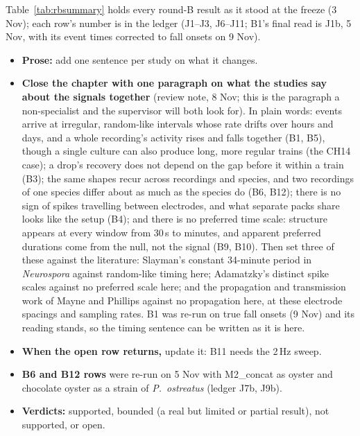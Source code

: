 \begin{instructions}
Table~\ref{tab:rbsummary} holds every round-B result as it stood at the freeze (3 Nov); each row's number is in the
ledger (J1--J3, J6--J11; B1's final read is J1b, 5 Nov, with its event times corrected to fall onsets on 9 Nov).
\begin{itemize}
  \item \textbf{Prose:} add one sentence per study on what it changes.
  \item \textbf{Close the chapter with one paragraph on what the studies say about the signals together} (review note,
        8 Nov; this is the paragraph a non-specialist and the supervisor will both look for). In plain words: events
        arrive at irregular, random-like intervals whose rate drifts over hours and days, and a whole recording's activity
        rises and falls together (B1, B5), though a single culture can also produce long, more regular trains (the CH14
        case); a drop's recovery does not depend on the gap before it within a train (B3); the same shapes recur
        across recordings and species, and two recordings of one species differ about as much as the species do (B6,
        B12); there is no sign of spikes travelling between electrodes, and what separate packs share looks like the
        setup (B4); and there is no preferred time scale: structure appears at every window from 30\,s to minutes, and
        apparent preferred durations come from the null, not the signal (B9, B10). Then set three of these against the
        literature: Slayman's constant 34-minute period in \emph{Neurospora} \cite{slayman} against random-like timing
        here; Adamatzky's distinct spike scales \cite{adamatzky2023} against no preferred scale here; and the
        propagation and transmission work of Mayne and Phillips \cite{mayne,phillips} against no propagation here, at
        these electrode spacings and sampling rates. B1 was re-run on true fall onsets (9 Nov) and its reading stands,
        so the timing sentence can be written as it is here.
  \item \textbf{When the open row returns,} update it: B11 needs the 2\,Hz sweep.
  \item \textbf{B6 and B12 rows} were re-run on 5 Nov with M2\_concat as oyster and chocolate oyster as a strain of \emph{P.\ ostreatus} (ledger J7b, J9b).
  \item \textbf{Verdicts:} supported, bounded (a real but limited or partial result), not supported, or open.
\end{itemize}
\end{instructions}

